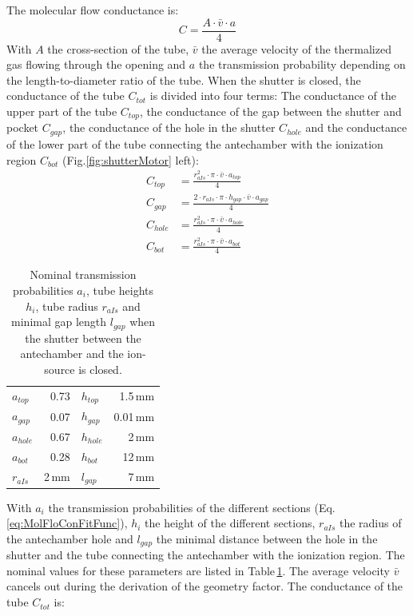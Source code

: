 	The molecular flow conductance is:
	\begin{equation}
		C = \frac{A\cdot\bar{v}\cdot a}{4}
	\end{equation}
	With $A$ the cross-section of the tube, $\bar{v}$ the average velocity of the thermalized gas flowing through the opening and $a$ the transmission probability depending on the length-to-diameter ratio of the tube. When the shutter is closed, the conductance of the tube $C_{tot}$ is divided into four terms: The conductance of the upper part of the tube $C_{top}$, the conductance of the gap between the shutter and pocket $C_{gap}$, the conductance of the hole in the shutter $C_{hole}$ and the conductance of the lower part of the tube connecting the antechamber with the ionization region $C_{bot}$ (Fig.\ref{fig:shutterMotor} left):
	\begin{align}
		C_{top}  &= \frac{r_{aIs}^2\cdot\pi\cdot\bar{v}\cdot a_{top}}{4}\\
		C_{gap}  &= \frac{2\cdot r_{aIs}\cdot \pi \cdot h_{gap}\cdot\bar{v}\cdot a_{gap}}{4}\\
		C_{hole} &= \frac{r_{aIs}^2\cdot\pi\cdot\bar{v}\cdot a_{hole}}{4}\\
		C_{bot}  &= \frac{r_{aIs}^2\cdot\pi\cdot\bar{v}\cdot a_{bot}}{4}
	\end{align}
	\begin{table}[h]
		\begin{center}
			\begin{tabular}{l r| l r }
				$a_{top}$	& 0.73 	& $h_{top}$		& 1.5\,mm	\\
				$a_{gap}$	& 0.07 	& $h_{gap}$		& 0.01\,mm \\
				$a_{hole}$ 	& 0.67 	& $h_{hole}$ 	& 2\,mm\\
				$a_{bot}$ 	& 0.28 	& $h_{bot}$ 	& 12\,mm\\
				$r_{aIs}$ 	& 2\,mm & $l_{gap}$ 	& 7\,mm\\
			\end{tabular}
		\end{center}
		\caption{Nominal transmission probabilities $a_i$, tube heights $h_i$, tube radius $r_{aIs}$ and minimal gap length $l_{gap}$ when the shutter between the antechamber and the ion-source is closed.}
		\label{tab:thMolFloConMotClosPara}
	\end{table}
	With $a_{i}$ the transmission probabilities of the different sections (Eq.\,\eqref{eq:MolFloConFitFunc}), $h_i$ the height of the different sections, $r_{aIs}$ the radius of the antechamber hole and $l_{gap}$ the minimal distance between the hole in the shutter and the tube connecting the antechamber with the ionization region. The nominal values for these parameters are listed in Table\,\ref{tab:thMolFloConMotClosPara}. The average velocity $\bar{v}$ cancels out during the derivation of the geometry factor. The conductance of the tube $C_{tot}$ is:
